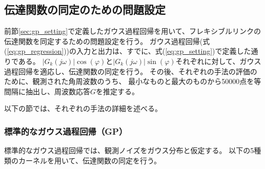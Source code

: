 
\subsection{伝達関数の同定のための問題設定}
\label{sec:transfer_function_identification}
前節\ref{sec:gp_setting}で定義したガウス過程回帰を用いて、フレキシブルリンクの伝達関数を同定するための問題設定を行う。
ガウス過程回帰(式(\ref{eq:gp_regression}))の入力と出力は、すでに、式(\ref{eq:gp_setting})で定義した通りである。
$|G_k(j\omega)| \cos(\varphi) $と$|G_k(j\omega)| \sin(\varphi)$それぞれに対して、ガウス過程回帰を適応し、伝達関数の同定を行う。
その後、それぞれの手法の評価のために、観測された角周波数のうち、
最小なものと最大のものから50000点を等間隔に抽出し、周波数応答$G$を推定する。

以下の節では、それぞれの手法の詳細を述べる。
\subsubsection{標準的なガウス過程回帰（GP）}
\label{sec:standard_gp}
標準的なガウス過程回帰では、観測ノイズをガウス分布と仮定する。
以下の5種類のカーネルを用いて、伝達関数の同定を行う。

